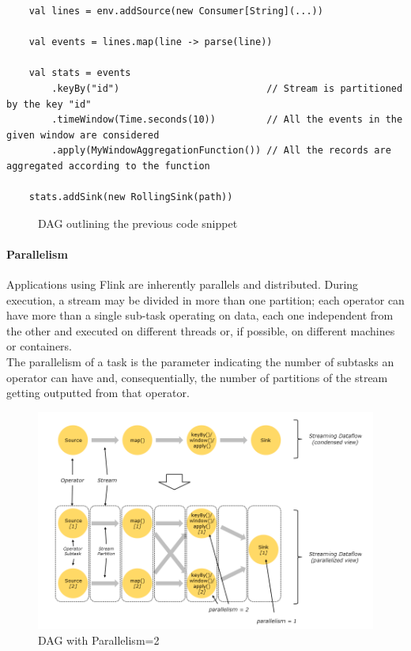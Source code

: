 \begin{verbatim}
    val lines = env.addSource(new Consumer[String](...))
	
    val events = lines.map(line -> parse(line))
	
    val stats = events
        .keyBy("id")                          // Stream is partitioned by the key "id"
        .timeWindow(Time.seconds(10))         // All the events in the given window are considered
        .apply(MyWindowAggregationFunction()) // All the records are aggregated according to the function
		
    stats.addSink(new RollingSink(path))
\end{verbatim}

\begin{figure}[th]
	\centering
	\def\svgwidth{\columnwidth}
	
	\decoRule
	\caption[Streaming Dataflow]{DAG outlining the previous code snippet}
	\label{fig:Dataflow}
\end{figure}

\paragraph{Parallelism} \label{ParallelismFlink}

Applications using Flink are inherently parallels and distributed. During execution, a stream may be divided in more than one partition; each operator can have more than a single sub-task operating on data, each one independent from the other and executed on different threads or, if possible, on different machines or containers.\\
The parallelism of a task is the parameter indicating the number of subtasks an operator can have and, consequentially, the number of partitions of the stream getting outputted from that operator.\\

\begin{figure}
    \centering
    \includegraphics{Figures/parallel_dataflow.png}
    \decoRule
    \caption[Parallel Dataflow]{DAG with Parallelism=2}
    \label{fig:ParallelDataflow}
\end{figure}


